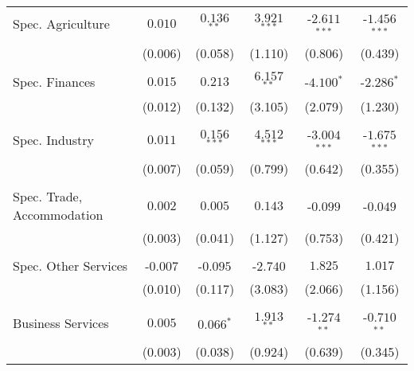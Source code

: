 \documentclass[11pt]{article}
\begin{document}
\begin{table}[!htbp]
{\begin{minipage}{\textwidth}
\begin{tabular}{@{\extracolsep{5pt}} lccccc}
Spec. Agriculture & $0.010$ & $0.136$$^{**}$ & $3.921$$^{***}$ & $ $-$2.611$$^{***}$ & $ $-$1.456$$^{***}$ \\ 
& (0.006) &  (0.058) & (1.110) & (0.806) & (0.439)\\
&\\
Spec. Finances & $0.015$ & $0.213$ & $6.157$$^{**}$ & $ $-$4.100$$^{*}$ & $ $-$2.286$$^{*}$ \\ 
& (0.012) &  (0.132) & (3.105) & (2.079) & (1.230)\\
&\\
Spec. Industry & $0.011$ & $0.156$$^{***}$ & $4.512$$^{***}$ & $ $-$3.004$$^{***}$ & $ $-$1.675$$^{***}$ \\ 
& (0.007) &  (0.059) & (0.799) & (0.642) & (0.355)\\
&\\
Spec. Trade, Accommodation & $0.002$ & $0.005$ & $0.143$ & $ $-$0.099$ & $ $-$0.049$ \\
& (0.003) &  (0.041) & (1.127) & (0.753) & (0.421)\\
&\\
Spec. Other Services & $ $-$0.007$ & $ $-$0.095$ & $ $-$2.740$ & $1.825$ & $1.017$ \\ 
& (0.010) &  (0.117) & (3.083) & (2.066) & (1.156)\\
&\\
Business Services & $0.005$ & $0.066$$^{*}$ & $1.913$$^{**}$ & $ $-$1.274$$^{**}$ & $ $-$0.710$$^{**}$ \\ 
& (0.003) &  (0.038) & (0.924) & (0.639) & (0.345)\\



\end{tabular}
\end{minipage}}
\end{table}
\end{document}
